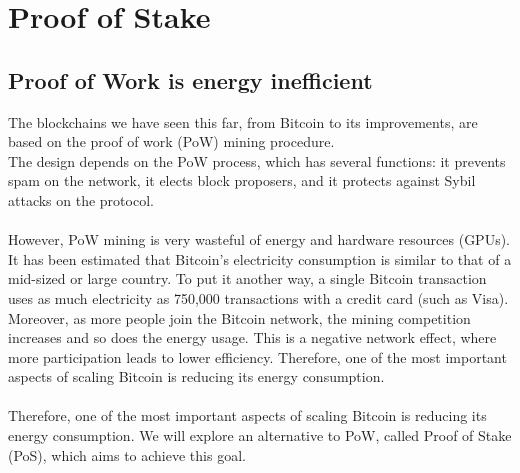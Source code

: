 \chapter{Proof of Stake}
\section{Proof of Work is energy inefficient}
The blockchains we have seen this far, from Bitcoin to its improvements, are based on the proof of work (PoW) mining procedure.\\
The design depends on the PoW process, which has several functions: it prevents spam on the network, it elects block proposers, and it protects against Sybil attacks on the protocol.\\\\
However, PoW mining is very wasteful of energy and hardware resources (GPUs). It has been estimated that Bitcoin’s electricity consumption is similar to that of a mid-sized or large country. To put it another way, a single Bitcoin transaction uses as much electricity as 750,000 transactions with a credit card (such as Visa).\\
Moreover, as more people join the Bitcoin network, the mining competition increases and so does the energy usage.
This is a negative network effect, where more participation leads to lower efficiency. Therefore, one of the most important aspects of scaling Bitcoin is reducing its energy consumption.\\\\
Therefore, one of the most important aspects of scaling Bitcoin is reducing its energy consumption. We will explore an alternative to PoW, called Proof of Stake (PoS), which aims to achieve this goal.

